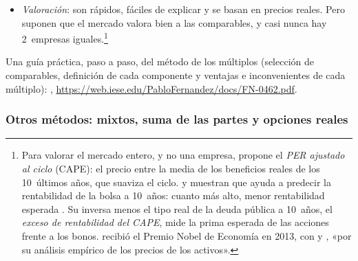 \documentclass[11pt]{article}
\begin{document}
\begin{itemize}
\begin{itemize}
  \item pero depende del endeudamiento, de los criterios contables y del ciclo, mezcla un precio que mira al futuro con un beneficio pasado y no sirve con pérdidas;
  \item el $\mathrm{EV}/\mathrm{EBITDA}$ es más estable y no depende del endeudamiento ni de la amortización;
  \item regla práctica: con empresas de apalancamiento muy distinto, los múltiplos del valor de la empresa; con apalancamientos parecidos, el PER puede valer (comparación completa en el anexo~\ref{anexo:multiplos}).
  \end{itemize}
\item \emph{Valoración}: son rápidos, fáciles de explicar y se basan en precios reales. Pero suponen que el mercado valora bien a las comparables, y casi nunca hay 2~empresas iguales.\footnote{Para valorar el mercado entero, y no una empresa,  propone el \emph{PER ajustado al ciclo} (CAPE): el precio entre la media de los beneficios reales de los 10~últimos años, que suaviza el ciclo.  y  muestran que ayuda a predecir la rentabilidad de la bolsa a 10~años: cuanto más alto, menor rentabilidad esperada\nocite{CampbellShiller1988,CampbellShiller1998} . Su inversa menos el tipo real de la deuda pública a 10~años, el \emph{exceso de rentabilidad del CAPE}, mide la prima esperada de las acciones frente a los bonos\nocite{Economist2021Stocks}.  recibió el Premio Nobel de Economía en 2013, con  y , «por su análisis empírico de los precios de los activos»\nocite{Nobel2013FamaHansenShiller}.}
\end{itemize}

\begin{anotaciones}
Una guía práctica, paso a paso, del método de los múltiplos (selección de comparables, definición de cada componente y ventajas e inconvenientes de cada múltiplo): \textcite{BadenesSantos1999Multiplos}, \url{https://web.iese.edu/PabloFernandez/docs/FN-0462.pdf}.
\end{anotaciones}

\subsubsection{Otros métodos: mixtos, suma de las partes y opciones reales}\label{sec:otros-metodos}
\end{document}
